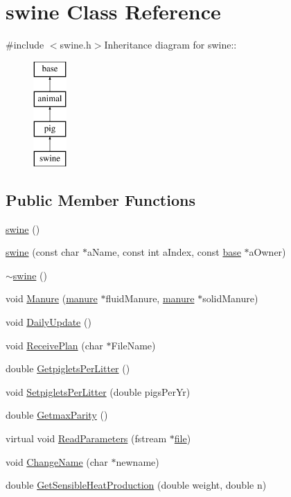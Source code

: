 \hypertarget{classswine}{
\section{swine Class Reference}
\label{classswine}
}


{\ttfamily \#include $<$swine.h$>$}Inheritance diagram for swine::\begin{figure}[H]
\begin{center}
\leavevmode
\includegraphics[height=4cm]{classswine}
\end{center}
\end{figure}
\subsection*{Public Member Functions}
\begin{DoxyCompactItemize}
\item 
\hyperlink{classswine_a596ba6b6d36fb9674efb9af20138269b}{swine} ()
\item 
\hyperlink{classswine_ade28c6b738f570b312d65c7646dd23bf}{swine} (const char $\ast$aName, const int aIndex, const \hyperlink{classbase}{base} $\ast$aOwner)
\item 
\hyperlink{classswine_ae27fca38d2543b633e9f1407a47bbe3e}{$\sim$swine} ()
\item 
void \hyperlink{classswine_ad92430630a6202c56dd7ca32e57784ac}{Manure} (\hyperlink{classmanure}{manure} $\ast$fluidManure, \hyperlink{classmanure}{manure} $\ast$solidManure)
\item 
void \hyperlink{classswine_aa5b1551767e9bc33a2dad33ef32627fb}{DailyUpdate} ()
\item 
void \hyperlink{classswine_af290612a28b7676522d5ae1f450c44ec}{ReceivePlan} (char $\ast$FileName)
\item 
double \hyperlink{classswine_a9571c1623a0461c8fef99a0a4f4aafb7}{GetpigletsPerLitter} ()
\item 
void \hyperlink{classswine_a3e452ad14938178c13053b5733f72b78}{SetpigletsPerLitter} (double pigsPerYr)
\item 
double \hyperlink{classswine_a124dd4455caf560d2fa677230dcf38c6}{GetmaxParity} ()
\item 
virtual void \hyperlink{classswine_a57668c3c30994f0c3969dcef6d7280db}{ReadParameters} (fstream $\ast$\hyperlink{classbase_a3af52ee9891719d09b8b19b42450b6f6}{file})
\item 
void \hyperlink{classswine_aa53f35964f2b752022d2f413590a99b0}{ChangeName} (char $\ast$newname)
\item 
double \hyperlink{classswine_ab379109f2fea2e0fe5e649b8c59df202}{GetSensibleHeatProduction} (double weight, double n)
\end{DoxyCompactItemize}


